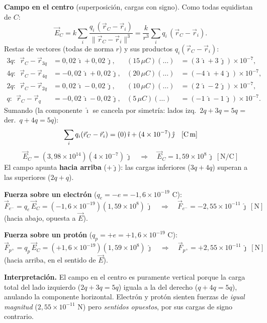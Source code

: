 \documentclass[12pt,letterpaper]{article}
\begin{document}
\noindent\textbf{Campo en el centro} (superposici\'on, cargas con signo). Como todas equidistan de $C$:
\[
    \vec E_C = k\sum_i \frac{q_i\,(\vec r_C-\vec r_i)}{\lVert\vec r_C-\vec r_i\rVert^{3}}
             = \frac{k}{r^{3}}\sum_i q_i\,(\vec r_C-\vec r_i).
\]
Restas de vectores (todas de norma $r$) y sus productos $q_i(\vec r_C-\vec r_i)$:
\begin{align*}
    3q:\ \ \vec r_C-\vec r_{3q} &= 0{,}02\,\hat\imath+0{,}02\,\hat\jmath, & (15\,\mu C)(\ldots) &= (3\,\hat\imath+3\,\hat\jmath)\times10^{-7},\\
    4q:\ \ \vec r_C-\vec r_{4q} &= -0{,}02\,\hat\imath+0{,}02\,\hat\jmath, & (20\,\mu C)(\ldots) &= (-4\,\hat\imath+4\,\hat\jmath)\times10^{-7},\\
    2q:\ \ \vec r_C-\vec r_{2q} &= 0{,}02\,\hat\imath-0{,}02\,\hat\jmath, & (10\,\mu C)(\ldots) &= (2\,\hat\imath-2\,\hat\jmath)\times10^{-7},\\
    q:\ \ \vec r_C-\vec r_{q} &= -0{,}02\,\hat\imath-0{,}02\,\hat\jmath, & (5\,\mu C)(\ldots) &= (-1\,\hat\imath-1\,\hat\jmath)\times10^{-7}.
\end{align*}
Sumando (la componente $\hat\imath$ se cancela por simetr\'ia: lados izq.\ $2q{+}3q=5q$ = der.\ $q{+}4q=5q$):
\[
    \sum_i q_i(\vec r_C-\vec r_i) = (0)\,\hat\imath + (4\times10^{-7})\,\hat\jmath \quad[\text{C\,m}]
\]
\[
    \vec E_C = (3{,}98\times10^{14})(4\times10^{-7})\,\hat\jmath
    \quad\Longrightarrow\quad
    \boxed{\vec E_C = 1{,}59\times10^{8}\,\hat\jmath\ [\text{N/C}]}
\]
El campo apunta \textbf{hacia arriba} ($+\hat\jmath$): las cargas inferiores ($3q+4q$) superan a las superiores ($2q+q$).

\medskip

\noindent\textbf{Fuerza sobre un electr\'on} ($q_{e}=-e=-1{,}6\times10^{-19}$ C):
\[
    \vec F_{e^-} = q_e\,\vec E_C = (-1{,}6\times10^{-19})(1{,}59\times10^{8})\,\hat\jmath
    \quad\Longrightarrow\quad
    \boxed{\vec F_{e^-} = -2{,}55\times10^{-11}\,\hat\jmath\ [\text{N}]}
\]
(hacia abajo, opuesta a $\vec E$).

\medskip

\noindent\textbf{Fuerza sobre un prot\'on} ($q_{p}=+e=+1{,}6\times10^{-19}$ C):
\[
    \vec F_{p^+} = q_p\,\vec E_C = (+1{,}6\times10^{-19})(1{,}59\times10^{8})\,\hat\jmath
    \quad\Longrightarrow\quad
    \boxed{\vec F_{p^+} = +2{,}55\times10^{-11}\,\hat\jmath\ [\text{N}]}
\]
(hacia arriba, en el sentido de $\vec E$).

\medskip

\noindent\textbf{Interpretaci\'on.} El campo en el centro es puramente vertical porque la carga total del
lado izquierdo ($2q+3q=5q$) iguala a la del derecho ($q+4q=5q$), anulando la componente horizontal.
Electr\'on y prot\'on sienten fuerzas de \emph{igual magnitud} ($2{,}55\times10^{-11}$ N) pero
\emph{sentidos opuestos}, por sus cargas de signo contrario.
\end{document}
